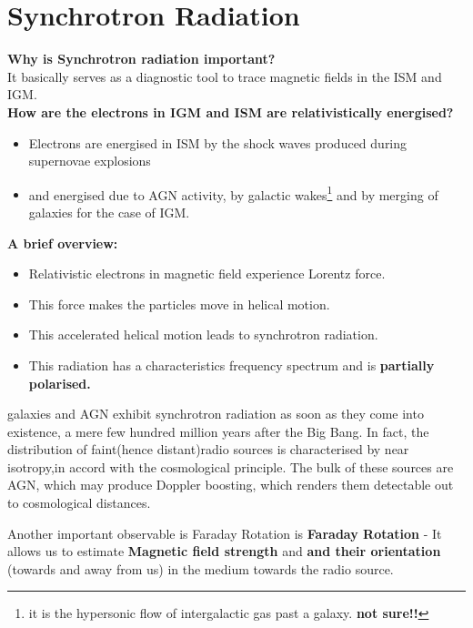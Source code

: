 \documentclass[11pt]{report}
\newcommand{\fn}[1]{\footnote{#1}}
\newcommand{\cbox}{tcolorbox}
\begin{document}
\section{Synchrotron Radiation}
\textbf{Why is Synchrotron radiation important? }\\
It basically serves as a diagnostic tool to trace magnetic fields in the ISM and IGM. \\
\textbf{How are the electrons in IGM and ISM are relativistically energised?}\\
\begin{itemize}
\item Electrons are energised in ISM by the shock waves produced during supernovae explosions\\
\item and energised due to AGN activity, by galactic wakes\fn{it is the hypersonic flow of intergalactic gas past a galaxy. \textbf{not sure!!} } and by merging of galaxies for the case of IGM.
\end{itemize}
\textbf{A brief overview:}
\begin{itemize}
\item Relativistic electrons in magnetic field experience Lorentz force.
\item This force makes the particles move in helical motion.
\item This accelerated helical motion leads to synchrotron radiation.
\item This radiation has a characteristics frequency spectrum and is \textbf{partially polarised.}
\end{itemize}
\begin{\cbox}
 galaxies and AGN exhibit synchrotron radiation as soon as they come into existence, a mere few hundred million years after the Big Bang. In fact, the distribution of faint(hence distant)radio sources is characterised by near isotropy,in accord with the cosmological principle. The bulk of these sources are AGN, which may produce Doppler boosting, which renders them detectable out to cosmological distances. 
\end{\cbox}
Another important observable is Faraday Rotation is \textbf{Faraday Rotation} - It allows us to estimate \textbf{Magnetic field strength} and \textbf{and their orientation} (towards and away from us) in the medium towards the radio source.
\end{document}
